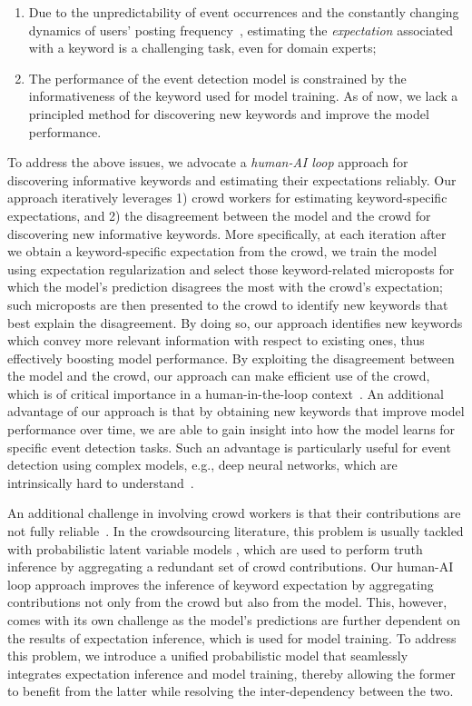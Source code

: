 \documentclass[letterpaper]{article}
\begin{document}
\begin{enumerate}
    \item Due to the unpredictability of event occurrences and the constantly changing dynamics of users' posting frequency~\cite{myers2014bursty}, estimating the \emph{expectation} associated with a keyword is a challenging task, even for domain experts;
    \item The performance of the event detection model is constrained by the informativeness of the keyword used for model training. As of now, we lack a principled method for discovering new keywords and improve the model performance.
\end{enumerate}


To address the above issues, we advocate a \emph{human-AI loop} approach for discovering informative keywords and estimating their expectations reliably. Our approach iteratively leverages 1) crowd workers for estimating keyword-specific expectations, and 2) the disagreement between the model and the crowd for discovering new informative keywords. More specifically, at each iteration after we obtain a keyword-specific expectation from the crowd, we train the model using expectation regularization and select those keyword-related microposts for which the model's prediction disagrees the most with the crowd's expectation; such microposts are then presented to the crowd to identify new keywords that best explain the disagreement. By doing so, our approach identifies new keywords which convey more relevant information with respect to existing ones, thus effectively boosting model performance. By exploiting the disagreement between the model and the crowd, our approach can make efficient use of the crowd, which is of critical importance in a human-in-the-loop context~\cite{yan2011active,yang2018leveraging}. An additional advantage of our approach is that by obtaining new keywords that improve model performance over time, we are able to gain insight into how the model learns for specific event detection tasks. Such an advantage is particularly useful for event detection using complex models, e.g., deep neural networks, which are intrinsically hard to understand~\cite{ribeiro2016should,doshi2017towards}. %

An additional challenge in involving crowd workers is that their contributions are not fully reliable~\cite{vaughan2017making}. In the crowdsourcing literature, this problem is usually tackled with probabilistic latent variable models \cite{dawid1979maximum,whitehill2009whose,zheng2017truth}, which are used to perform truth inference by aggregating a redundant set of crowd contributions. Our human-AI loop approach improves the inference of keyword expectation by aggregating contributions not only from the crowd but also from the model. This, however, comes with its own challenge as the model's predictions are further dependent on the results of expectation inference, which is used for model training. To address this problem, we introduce a unified probabilistic model that seamlessly integrates expectation inference and model training, thereby allowing the former to benefit from the latter while resolving the inter-dependency between the two.
\end{document}
